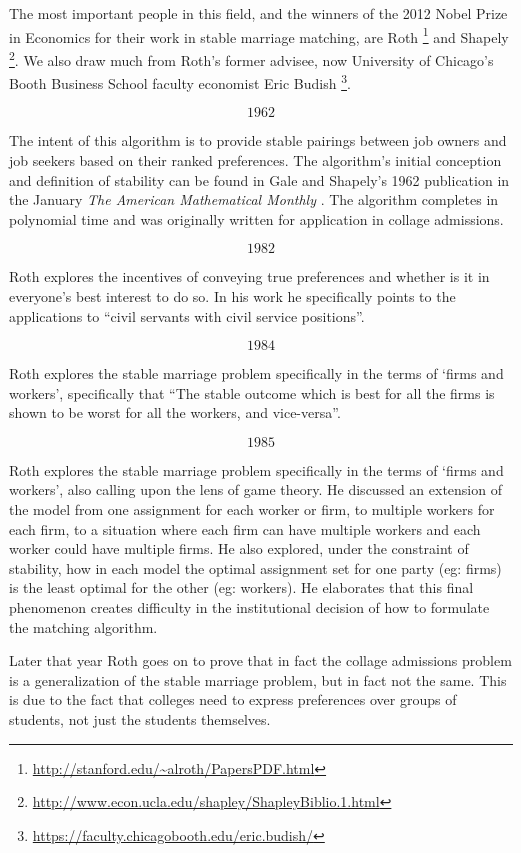 The most important people in this field, and the winners of the 2012 Nobel Prize in Economics for their work in stable marriage matching, are Roth \footnote{\url{http://stanford.edu/~alroth/PapersPDF.html}} and Shapely \footnote{\url{http://www.econ.ucla.edu/shapley/ShapleyBiblio.1.html}}. We also draw much from Roth's former advisee, now University of Chicago's Booth Business School faculty economist Eric Budish \footnote{\url{https://faculty.chicagobooth.edu/eric.budish/}}.

\[1962\]

The intent of this algorithm is to provide stable pairings between job owners and job seekers based on their ranked preferences. The algorithm's initial conception and definition of stability can be found in Gale and Shapely's 1962 publication in the January \textit{The American Mathematical Monthly} \citep{1962_Gale}. The algorithm completes in polynomial time and was originally written for application in collage admissions.

\[1982\]

Roth explores the incentives of conveying true preferences and whether is it in everyone's best interest to do so. \citep{1982_Roth} In his work he specifically points to the applications to ``civil servants with civil service positions''.

\[1984\]

Roth explores the stable marriage problem specifically in the terms of `firms and workers', specifically that ``The stable outcome which is best for all the firms is shown to be worst for all the workers, and vice-versa''.\citep{1984_Roth}

\[1985\]

Roth explores the stable marriage problem specifically in the terms of `firms and workers', also calling upon the lens of game theory.\citep{1985_Roth} He discussed an extension of the model from one assignment for each worker or firm, to multiple workers for each firm, to a situation where each firm can have multiple workers and each worker could have multiple firms. He also explored, under the constraint of stability, how in each model the optimal assignment set for one party (eg: firms) is the least optimal for the other (eg: workers). He elaborates that this final phenomenon creates difficulty in the institutional decision of how to formulate the matching algorithm.

Later that year Roth goes on to prove that in fact the collage admissions problem is a generalization of the stable marriage problem, but in fact not the same. This is due to the fact that colleges need to express preferences over groups of students, not just the students themselves. \citep{1985_Roth_b}

